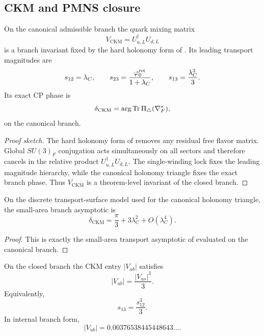 \subsection{CKM and PMNS closure}

\begin{theorem}
\label{thm:ckm-closure}
On the canonical admissible branch the quark mixing matrix
\[
V_{\mathrm{CKM}}=U_{u,L}^\dagger U_{d,L}
\]
is a branch invariant fixed by the hard holonomy form of
. Its leading transport magnitudes are
\begin{equation}
\label{eq:ckm-magnitudes}
s_{12}=\lambda_C,
\qquad
s_{23}=\frac{\varphi_0^{\mathrm{ret}}}{1+\lambda_C},
\qquad
s_{13}=\frac{\lambda_C^3}{3}.
\end{equation}
Its exact CP phase is
\[
\delta_{\mathrm{CKM}}=\arg\operatorname{Tr}\Pi_\triangle(\nabla_F^\star),
\]
on the canonical branch.
\end{theorem}

\begin{proof}[Proof sketch]
The hard holonomy form of  removes any residual free flavor
matrix. Global $SU(3)_F$ conjugation acts simultaneously on all sectors and therefore cancels in
the relative product $U_{u,L}^\dagger U_{d,L}$. The single-winding lock fixes the leading magnitude
hierarchy, while the canonical holonomy triangle fixes the exact branch phase. Thus
$V_{\mathrm{CKM}}$ is a theorem-level invariant of the closed branch.
\end{proof}

\begin{proposition}
\label{prop:ckm-phase-asymptotic}
On the discrete transport-surface model used for the canonical holonomy triangle, the small-area
branch asymptotic is
\begin{equation}
\label{eq:ckm-phase}
\delta_{\mathrm{CKM}}=\frac{\pi}{3}+3\lambda_C^2+O(\lambda_C^4).
\end{equation}
\end{proposition}

\begin{proof}
This is exactly the small-area transport asymptotic of
 evaluated on the canonical branch.
\end{proof}

\begin{corollary}
\label{cor:cubic-vub-law}
On the closed branch the CKM entry $|V_{ub}|$ satisfies
\[
|V_{ub}|=\frac{|V_{us}|^3}{3}.
\]
Equivalently,
\[
s_{13}=\frac{s_{12}^3}{3}.
\]
In internal branch form,
\[
|V_{ub}|=0.00376538445448643\ldots.
\]
\end{corollary}

